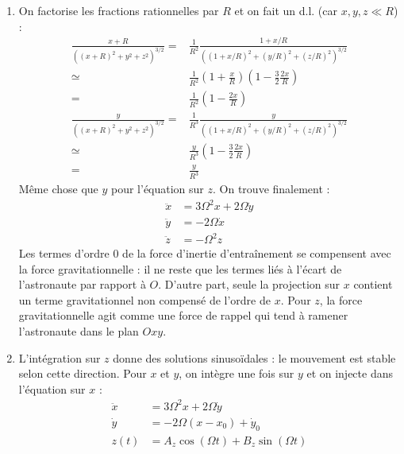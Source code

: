 \begin{correction}
\begin{enumerate}
\item On factorise les fractions rationnelles par $R$ et on fait un d.l. (car $x,y,z\ll R$) :
\begin{align*}
	\frac{x+R}{{\left((x+R)^2+y^2+z^2\right)^{3/2}}}=&\frac{1}{R^2}\frac{1+x/R}{\left(\left(1+x/R \right)^2+\left(y/R \right)^2+\left(z/R\right)^2\right)^{3/2}}\\
	\simeq&\frac{1}{R^2}\left(1+\frac{x}{R} \right)\left(1-\frac{3}{2}\frac{2x}{R} \right) \\
	=&\frac{1}{R^2}\left(1-\frac{2x}{R} \right)
\end{align*}
\begin{align*}
	\frac{y}{{\left((x+R)^2+y^2+z^2\right)^{3/2}}}=&\frac{1}{R^3}\frac{y}{\left(\left(1+x/R \right)^2+\left(y/R \right)^2+\left(z/R\right)^2\right)^{3/2}}\\
	\simeq&\frac{y}{R^3}\left(1-\frac{3}{2}\frac{2x}{R} \right) \\
	=&\frac{y}{R^3}
\end{align*}
Même chose que $y$ pour l'équation sur $z$. On trouve finalement :
\begin{align*}
	\ddot{x}&=3\Omega^2x+2\Omega \dot{y} \\
	\ddot{y}&=-2\Omega \dot{x} \\
	\ddot{z}&=-\Omega^2z
\end{align*}
Les termes d'ordre 0 de la force d'inertie d'entraînement se compensent avec la force gravitationnelle : il ne reste que les termes liés à l'écart de l'astronaute par rapport à $O$. D'autre part, seule la projection sur $x$ contient un terme gravitationnel non compensé de l'ordre de $x$. Pour $z$, la force gravitationnelle agit comme une force de rappel qui tend à ramener l'astronaute dans le plan $Oxy$.

\item L'intégration sur $z$ donne des solutions sinusoïdales : le mouvement est stable selon cette direction. Pour $x$ et $y$, on intègre une fois sur $y$ et on injecte dans l'équation sur $x$ :
\begin{align*}
	\ddot{x}&=3\Omega^2x+2\Omega \dot{y} \\
	\dot{y}&=-2\Omega (x-x_0) + \dot{y}_0\\
	z(t)&=A_z\cos(\Omega t)+B_z\sin(\Omega t)
\end{align*}


\end{enumerate}
\end{correction}

